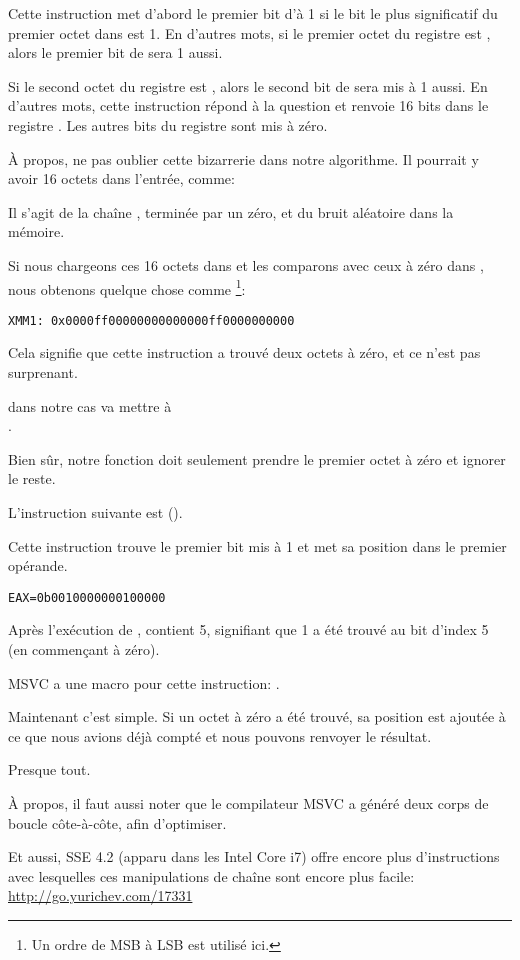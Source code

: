 Cette instruction met d'abord le premier bit d'\EAX à 1 si le bit le plus significatif
du premier octet dans  est 1.
En d'autres mots, si le premier octet du registre  est , alors le
premier bit de \EAX sera 1 aussi.

Si le second octet du registre  est , alors le second bit de \EAX
sera mis à 1 aussi.
En d'autres mots, cette instruction répond à la question  et renvoie
16 bits dans le registre \EAX.
Les autres bits du registre \EAX sont mis à zéro.

À propos, ne pas oublier cette bizarrerie dans notre algorithme.
Il pourrait y avoir 16 octets dans l'entrée, comme:



Il s'agit de la chaîne , terminée par un zéro, et du bruit aléatoire
dans la mémoire.

Si nous chargeons ces 16 octets dans  et les comparons avec ceux à zéro dans
, nous obtenons quelque chose comme \footnote{Un ordre de \ac{MSB} à \ac{LSB}
est utilisé ici.}:

\begin{verbatim}
XMM1: 0x0000ff00000000000000ff0000000000
\end{verbatim}

Cela signifie que cette instruction a trouvé deux octets à zéro, et ce n'est pas
surprenant.

 dans notre cas va mettre \EAX à\\
.

Bien sûr, notre fonction doit seulement prendre le premier octet à zéro et ignorer
le reste.

\label{instruction_BSF}
L'instruction suivante est  ().

Cette instruction trouve le premier bit mis à 1 et met sa position dans le premier
opérande.

\begin{verbatim}
EAX=0b0010000000100000
\end{verbatim}

Après l'exécution de , \EAX contient 5, signifiant que 1 a été trouvé
au bit d'index 5 (en commençant à zéro).

MSVC a une macro pour cette instruction: .

Maintenant c'est simple. Si un octet à zéro a été trouvé, sa position est ajoutée
à ce que nous avions déjà compté et nous pouvons renvoyer le résultat.

Presque tout.

À propos, il faut aussi noter que le compilateur MSVC a généré deux corps de boucle
côte-à-côte, afin d'optimiser.

Et aussi, SSE 4.2 (apparu dans les Intel Core i7) offre encore plus d'instructions
avec lesquelles ces manipulations de chaîne sont encore plus facile: \url{http://go.yurichev.com/17331}
